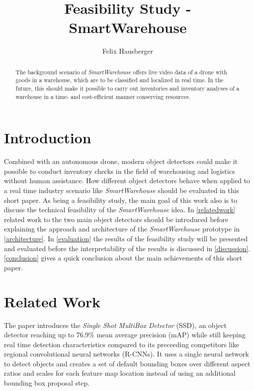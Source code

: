 \documentclass[a4paper, 10pt, journal]{wissarbIEEE}      %
\title{\LARGE \bf Feasibility Study - SmartWarehouse}
\author{Felix Hausberger}
\begin{document}
	

\maketitle

\begin{abstract}

The background scenario of \textit{SmartWarehouse} offers live video data of a drone with goods in a warehouse, which are to be classified and localized in real time. In the future, this should make it possible to carry out inventories and inventory analyses of a warehouse in a time- and cost-efficient manner conserving resources.

\end{abstract}

\section{Introduction}

Combined with an autonomous drone, modern object detectors could make it possible to conduct inventory checks in the field of warehousing and logistics without human assistance. How different object detectors behave when applied to a real time industry scenario like \textit{SmartWarehouse} should be evaluated in this short paper. As being a feasibility study, the main goal of this work also is to discuss the technical feasibility of the \textit{SmartWarehouse} idea. In \autoref{relatedwork} related work to the two main object detectors should be introduced before explaining the approach and architecture of the \textit{SmartWarehouse} prototype in \autoref{architecture}. In \autoref{evaluation} the results of the feasibility study will be presented and evaluated before the interpretability of the results is discussed in \autoref{discussion}. \autoref{conclusion} gives a quick conclusion about the main achievements of this short paper.

\section{Related Work} \label{relatedwork}

The paper \cite{WeiLiuDragomirAnguelovDumitruErhanChristianSzegedyScottReedChengYangFuAlexander.2016} introduces the \textit{Single Shot MultiBox Detector} (SSD), an object detector reaching up to 76.9\% mean average precision (mAP) while still keeping real time detection characteristics compared to its preceeding competitors like regional convolutional neural networks (R-CNNs). It uses a single neural network to detect objects and creates a set of default bounding boxes over different aspect ratios and scales for each feature map location instead of using an additional bounding box proposal step. 
\end{document}
